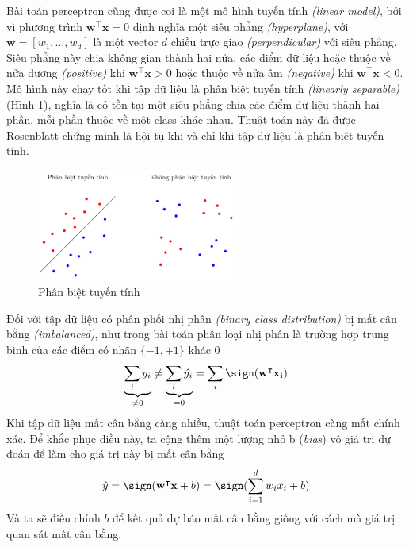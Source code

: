 Bài toán perceptron cũng được coi là một mô hình tuyến tính \textit{(linear model)}, bởi vì phương trình $\mathbf{w^\intercal x}=0$ định nghĩa một siêu phẳng \textit{(hyperplane)}, với $\mathbf{w}=[w_1,\dots,w_d]$ là một vector $d$ chiều trực giao \textit{(perpendicular)} với siêu phẳng. Siêu phẳng này chia không gian thành hai nửa, các điểm dữ liệu hoặc thuộc về nửa dương \textit{(positive)} khi $\mathbf{w^\intercal x}>0$ hoặc thuộc về nửa âm \textit{(negative)} khi $\mathbf{w^\intercal x}<0$. Mô hình này chạy tốt khi tập dữ liệu là phân biệt tuyến tính \textit{(linearly separable)} (Hình \ref{figure:linearly-separable}), nghĩa là có tồn tại một siêu phẳng chia các điểm dữ liệu thành hai phần, mỗi phần thuộc về một class khác nhau. Thuật toán này đã được Rosenblatt chứng minh là hội tụ khi và chỉ khi tập dữ liệu là phân biệt tuyến tính.\cite{Aggarwal2023-zk}
\begin{figure}[htbp]
    \centering
    \includegraphics[width=0.6\textwidth]{tikz_image/linearly_separable.pdf}
    \caption{Phân biệt tuyến tính}
    \label{figure:linearly-separable}
\end{figure}

Đối với tập dữ liệu có phân phối nhị phân \textit{(binary class distribution)} bị mất cân bằng \textit{(imbalanced)}, như trong bài toán phân loại nhị phân là trường hợp trung bình của các điểm có nhãn $\{-1, +1\}$ khác $0$
\begin{align}
    \underbrace{\sum_i y_i}_{\neq 0}\neq\underbrace{\sum_i\hat{y_i}}_{=0}=\sum_i\sign(\mathbf{w}^\intercal\mathbf{x_i})
\end{align}
Khi tập dữ liệu mất cân bằng càng nhiều, thuật toán perceptron càng mất chính xác. Để khắc phục điều này, ta cộng thêm một lượng nhỏ b (\textit{bias}) vô giá trị dự đoán để làm cho giá trị này bị mất cân bằng
\begin{align}
    \hat{y}=\sign(\mathbf{w^\intercal x}+b)=\sign(\sum^d_{i=1}w_ix_i+b)
\end{align}
Và ta sẽ điều chỉnh $b$ để kết quả dự báo mất cân bằng giống với cách mà giá trị quan sát mất cân bằng.

